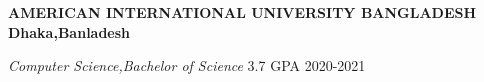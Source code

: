 \textbf{AMERICAN INTERNATIONAL UNIVERSITY BANGLADESH \hfill Dhaka,Banladesh} \par
\textit{Computer Science,Bachelor of Science} 3.7 GPA \hfill 2020-2021\par

